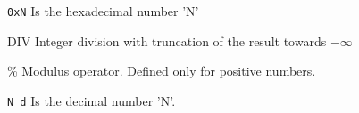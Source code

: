 \documentclass[
	12pt,				%
	openright,			%
	twoside,			%
	a4paper,			%
	brazil,
	french,				%
	english
	]{abntex2}
\begin{document}



\listoffigures*
\cleardoublepage

\listoftables*
\cleardoublepage





\begin{simbolos}
  \item[\texttt{0xN}] Is the hexadecimal number 'N'
  \item[DIV] Integer division with truncation of the result towards $-\infty$
  \item[\%] Modulus operator. Defined only for positive numbers.
  \item[\texttt{N d}] Is the decimal number 'N'.
\end{simbolos}
\end{document}
